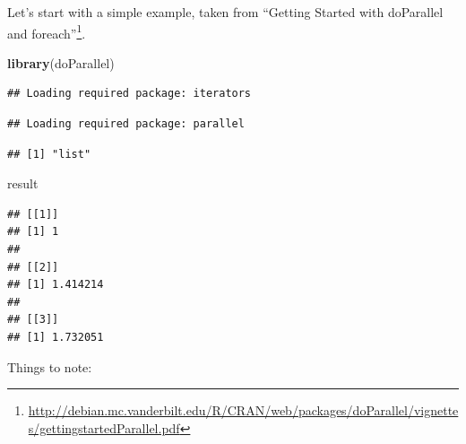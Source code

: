 \documentclass[]{book}
\newenvironment{Shaded}{\begin{snugshade}}{\end{snugshade}}
\newcommand{\DataTypeTok}[1]{\textcolor[rgb]{0.13,0.29,0.53}{#1}}
\newcommand{\DecValTok}[1]{\textcolor[rgb]{0.00,0.00,0.81}{#1}}
\newcommand{\KeywordTok}[1]{\textcolor[rgb]{0.13,0.29,0.53}{\textbf{#1}}}
\newcommand{\NormalTok}[1]{#1}
\newcommand{\OperatorTok}[1]{\textcolor[rgb]{0.81,0.36,0.00}{\textbf{#1}}}
\newcommand{\StringTok}[1]{\textcolor[rgb]{0.31,0.60,0.02}{#1}}
\renewcommand{\href}[2]{#2\footnote{\url{#1}}}
\theoremstyle{definition}
\theoremstyle{definition}
\theoremstyle{definition}
\theoremstyle{remark}
\begin{document}
Let's start with a simple example, taken from \href{http://debian.mc.vanderbilt.edu/R/CRAN/web/packages/doParallel/vignettes/gettingstartedParallel.pdf}{``Getting Started with doParallel and foreach''}.

\begin{Shaded}
\begin{Highlighting}[]
\KeywordTok{library}\NormalTok{(doParallel)}
\end{Highlighting}
\end{Shaded}

\begin{verbatim}
## Loading required package: iterators
\end{verbatim}

\begin{verbatim}
## Loading required package: parallel
\end{verbatim}

\begin{Shaded}
\end{Shaded}

\begin{verbatim}
## [1] "list"
\end{verbatim}

\begin{Shaded}
\begin{Highlighting}[]
\NormalTok{result}
\end{Highlighting}
\end{Shaded}

\begin{verbatim}
## [[1]]
## [1] 1
## 
## [[2]]
## [1] 1.414214
## 
## [[3]]
## [1] 1.732051
\end{verbatim}

Things to note:
\end{document}
